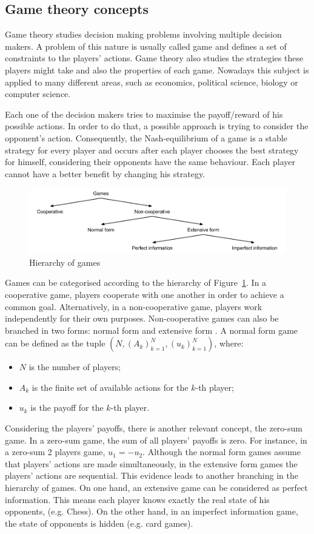 \subsection{Game theory concepts}

Game theory studies decision making problems involving multiple decision makers.
A problem of this nature is usually called game and defines a set of constraints to the players' actions.
Game theory also studies the strategies these players might take and also the properties of each game.
Nowadays this subject is applied to many different areas, such as economics, political science, biology or computer science.

Each one of the decision makers tries to maximise the payoff/reward of his possible actions.
In order to do that, a possible approach is trying to consider the opponent's action.
Consequently, the Nash-equilibrium of a game is a stable strategy for every player and occurs after each player chooses the best strategy for himself, considering their opponents have the same behaviour.
Each player cannot have a better benefit by changing his strategy.

\begin{figure}
\centering
\includegraphics[width=1\textwidth]{./img/gamesHierarchy}
\caption{Hierarchy of games}
\label{fig:games}
\end{figure}

Games can be categorised according to the hierarchy of Figure~\ref{fig:games}.
In a cooperative game, players cooperate with one another in order to achieve a common goal.
Alternatively, in a non-cooperative game, players work independently for their own purposes.
Non-cooperative games can also be branched in two forms: normal form and extensive form \cite{Shoham2010}.
A normal form game can be defined as the tuple $(N,(A_k)_{k=1}^{N},(u_k)_{k=1}^{N})$, where:
\begin{itemize}
\item $N$ is the number of players;
\item $A_k$ is the finite set of available actions for the $k$-th player;
\item $u_k$ is the payoff for the $k$-th player.
\end{itemize}
Considering the players' payoffs, there is another relevant concept, the zero-sum game.
In a zero-sum game, the sum of all players' payoffs is zero.
For instance, in a zero-sum 2 players game, $u_1 = -u_2$.
Although the normal form games assume that players' actions are made simultaneously, in the extensive form games the players' actions are sequential.
This evidence leads to another branching in the hierarchy of games.
On one hand, an extensive game can be considered as perfect information.
This means each player knows exactly the real state of his opponents, (e.g. Chess).
On the other hand, in an imperfect information game, the state of opponents is hidden (e.g. card games).

